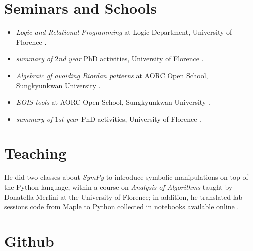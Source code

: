 \documentclass[a4paper]{tufte-handout}
\begin{document}
    \section{Seminars and Schools}

    \begin{itemize}
        \item \textit{Logic and Relational Programming} at Logic Department, University of Florence .
        \item \textit{summary of $2$nd year} PhD activities, University of Florence .
        \item \textit{Algebraic gf avoiding Riordan patterns} at AORC Open School, Sungkyunkwan University .
        \item \textit{EOIS tools} at AORC Open School, Sungkyunkwan University .
        \item \textit{summary of $1$st year} PhD activities, University of Florence .
    \end{itemize}

    \section{Teaching}

    He did two classes about \emph{SymPy} to introduce symbolic manipulations
    on top of the Python language, within a course on \emph{Analysis of
    Algorithms} taught by Donatella Merlini at the University of Florence; in
    addition, he translated lab sessions code from Maple to Python collected in
    notebooks available online
    .

    \section{Github}
\end{document}
